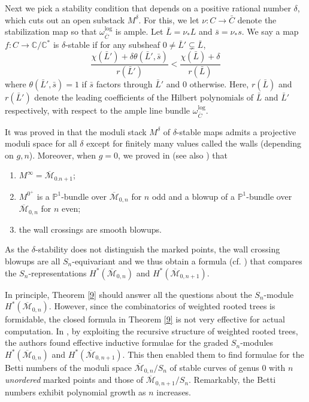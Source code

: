 \documentclass[11pt,letterpaper]{amsart}
\numberwithin{equation}{section}
\theoremstyle{definition}
\newcommand{\PP}{\mathbb{P}}
\def\CC{\mathbb{C}}
\newcommand{\cal}{\mathcal}
\def\cM{{\cal M}}
\def\ocM{\overline{\cM}}
\def\mzn{\overline{\cM}_{0,n} }
\def\log{\mathrm{log} }
\begin{document}
Next we pick a stability condition that depends on a positive rational number $\delta$, which cuts out an open substack $M^\delta$.
For this, we let $\nu:C\to \bar{C}$ denote the stabilization map so that $\omega_{\bar C}^\log$ is ample. Let $\bar L=\nu_*L$ and $\bar s=\nu_*s$. We say a map $f:C\to \CC/\CC^*$ is $\delta$-stable if for any subsheaf $0\ne \bar L'\subsetneq \bar L$,
$$\frac{\chi(\bar L')+\delta \theta(\bar L',\bar s)}{r(\bar L')}<\frac{\chi(\bar L)+\delta}{r(\bar L)}$$
where $\theta(\bar L',\bar s)=1$ if $\bar s$ factors through $\bar L'$ and $0$ otherwise. Here, $r(\bar L)$ and $r(\bar L')$ denote the leading coefficients of the Hilbert polynomials of $\bar L$ and $\bar L'$ respectively, with respect to the ample line bundle $\omega_{\bar C}^{\mathrm{log}}$.

It was proved in \cite[Theorem 5.10]{CK0} that the moduli stack $M^\delta$ of $\delta$-stable maps admits a projective moduli space for all $\delta$ except for finitely many values called the walls (depending on $g,n$). Moreover, when $g=0$, we proved in \cite[\S7]{CK0} (see also \cite[Theorem 2.8]{CKL1}) that
\begin{enumerate}
    \item  $M^\infty=\ocM_{0.n+1}$;
    \item $M^{0^+}$ is a $\PP^1$-bundle over $\mzn$ for $n$ odd and a blowup of a $\PP^1$-bundle  over $\mzn$ for $n$ even;
    \item the wall crossings are smooth blowups.
\end{enumerate}
As the $\delta$-stability does not distinguish the marked points, the wall crossing blowups are all $S_n$-equivariant and we thus obtain a formula (cf. \cite[Theorem 4.8]{CKL1}) that compares the $S_n$-representations $H^*(\mzn)$ and $H^*(\ocM_{0,n+1})$.

\medskip

In principle, Theorem \ref{9} should answer all the questions about the $S_n$-module $H^*(\mzn)$. However, since the combinatorics of weighted rooted trees is formidable, the closed formula in Theorem \ref{9} is not very effective for actual computation. In \cite{CKL2},
by exploiting the recursive structure of weighted rooted trees,
the authors found effective inductive formulae for the graded $S_n$-modules $H^*(\mzn)$ and $H^*(\ocM_{0,n+1})$.
This then enabled them to find formulae for the Betti numbers of the moduli space $\mzn/S_n$ of stable curves of genus $0$ with $n$ \emph{unordered} marked points and those of $\ocM_{0,n+1}/S_n$. Remarkably, the Betti numbers exhibit polynomial growth as $n$ increases.
\end{document}
